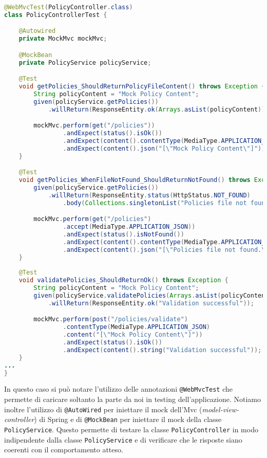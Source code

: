 \begin{lstlisting}[language=Java, caption=PolicyControllerTest, label=code:PolicyControllerTest, basicstyle=\fontsize{9}{10}\ttfamily]
@WebMvcTest(PolicyController.class)
class PolicyControllerTest {

    @Autowired
    private MockMvc mockMvc;

    @MockBean
    private PolicyService policyService;

    @Test
    void getPolicies_ShouldReturnPolicyFileContent() throws Exception {
        String policyContent = "Mock Policy Content";
        given(policyService.getPolicies())
            .willReturn(ResponseEntity.ok(Arrays.asList(policyContent)));

        mockMvc.perform(get("/policies"))
                .andExpect(status().isOk())
                .andExpect(content().contentType(MediaType.APPLICATION_JSON))
                .andExpect(content().json("[\"Mock Policy Content\"]"));
    }

    @Test
    void getPolicies_WhenFileNotFound_ShouldReturnNotFound() throws Exception {
        given(policyService.getPolicies())
            .willReturn(ResponseEntity.status(HttpStatus.NOT_FOUND)
                .body(Collections.singletonList("Policies file not found.")));

        mockMvc.perform(get("/policies")
                .accept(MediaType.APPLICATION_JSON))
                .andExpect(status().isNotFound())
                .andExpect(content().contentType(MediaType.APPLICATION_JSON))
                .andExpect(content().json("[\"Policies file not found.\"]"));
    }
    
    @Test
    void validatePolicies_ShouldReturnOk() throws Exception {
        String policyContent = "Mock Policy Content";
        given(policyService.validatePolicies(Arrays.asList(policyContent)))
            .willReturn(ResponseEntity.ok("Validation successful"));

        mockMvc.perform(post("/policies/validate")
                .contentType(MediaType.APPLICATION_JSON)
                .content("[\"Mock Policy Content\"]"))
                .andExpect(status().isOk())
                .andExpect(content().string("Validation successful"));
    }
...
}
\end{lstlisting}
In questo caso si può notare l'utilizzo delle annotazioni \texttt{@WebMvcTest} che permette di caricare soltanto la parte da noi in testing dell'applicazione. Notiamo inoltre l'utilizzo di \texttt{@AutoWired} per iniettare il mock dell'Mvc (\emph{model-view-controller}) di Spring e di \texttt{@MockBean} per iniettare il mock della classe \texttt{PolicyService}. Questo permette di testare la classe \texttt{PolicyController} in modo indipendente dalla classe \texttt{PolicyService} e di verificare che le risposte siano coerenti con il comportamento atteso.\par
